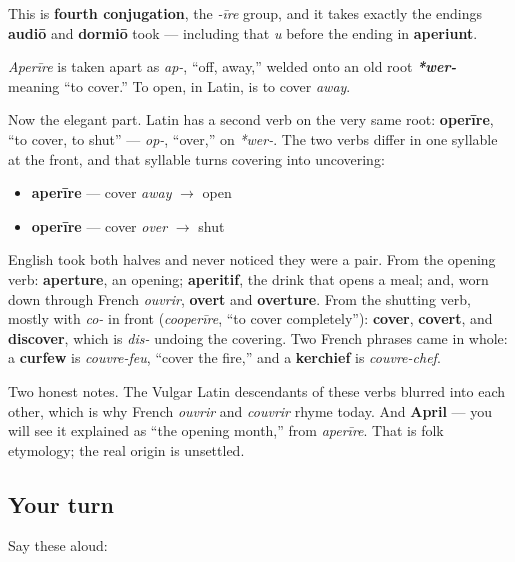 This is \textbf{fourth conjugation}, the \emph{-īre} group, and it takes exactly the endings \textbf{audiō} and \textbf{dormiō} took — including that \emph{u} before the ending in \textbf{aperiunt}.

\begin{cousinweb}
\emph{Aperīre} is taken apart as \emph{ap-}, \textquotedblleft{}off, away,\textquotedblright{} welded onto an old root \emph{\textbf{*wer-}} meaning \textquotedblleft{}to cover.\textquotedblright{} To open, in Latin, is to cover \emph{away}.

Now the elegant part. Latin has a second verb on the very same root: \textbf{operīre}, \textquotedblleft{}to cover, to shut\textquotedblright{} — \emph{op-}, \textquotedblleft{}over,\textquotedblright{} on \emph{*wer-}. The two verbs differ in one syllable at the front, and that syllable turns covering into uncovering:

\begin{itemize}
\raggedright
  \item \textbf{aperīre} — cover \emph{away} $\to$ open
  \item \textbf{operīre} — cover \emph{over} $\to$ shut
\end{itemize}

English took both halves and never noticed they were a pair. From the opening verb: \textbf{aperture}, an opening; \textbf{aperitif}, the drink that opens a meal; and, worn down through French \emph{ouvrir}, \textbf{overt} and \textbf{overture}. From the shutting verb, mostly with \emph{co-} in front (\emph{cooperīre}, \textquotedblleft{}to cover completely\textquotedblright{}): \textbf{cover}, \textbf{covert}, and \textbf{discover}, which is \emph{dis-} undoing the covering. Two French phrases came in whole: a \textbf{curfew} is \emph{couvre-feu}, \textquotedblleft{}cover the fire,\textquotedblright{} and a \textbf{kerchief} is \emph{couvre-chef}.

Two honest notes. The Vulgar Latin descendants of these verbs blurred into each other, which is why French \emph{ouvrir} and \emph{couvrir} rhyme today. And \textbf{April} — you will see it explained as \textquotedblleft{}the opening month,\textquotedblright{} from \emph{aperīre}. That is folk etymology; the real origin is unsettled.
\end{cousinweb}

\subsection*{Your turn}
Say these aloud:

